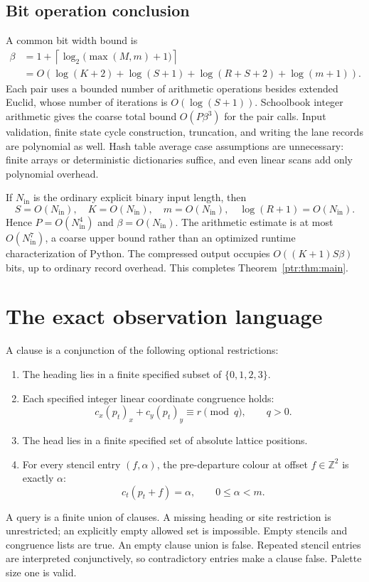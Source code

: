 \documentclass[11pt,letterpaper]{article}
\theoremstyle{definition}\newtheorem{definition}[theorem]{Definition}
\theoremstyle{remark}\newtheorem{remark}[theorem]{Remark}
\newcommand{\Z}{\mathbb Z}\newcommand{\N}{\mathbb N}\newcommand{\Zp}{\mathbb Z_{>0}}
\begin{document}
\subsection{Bit operation conclusion}
A common bit width bound is
\begin{align}\label{ptr:eq:beta}
 \beta&=1+\left\lceil\log_2\bigl(\max(M,m)+1\bigr)\right\rceil\nonumber\\
 &=O\!\left(\log(K+2)+\log(S+1)+\log(R+S+2)+\log(m+1)\right).
\end{align}
Each pair uses a bounded number of arithmetic operations besides extended Euclid, whose number of iterations is $O(\log(S+1))$. Schoolbook integer arithmetic gives the coarse total bound $O(P\beta^3)$ for the pair calls. Input validation, finite state cycle construction, truncation, and writing the lane records are polynomial as well. Hash table average case assumptions are unnecessary: finite arrays or deterministic dictionaries suffice, and even linear scans add only polynomial overhead.

If $N_{\mathrm{in}}$ is the ordinary explicit binary input length, then
\[
 S=O(N_{\mathrm{in}}),\quad K=O(N_{\mathrm{in}}),\quad m=O(N_{\mathrm{in}}),
 \quad\log(R+1)=O(N_{\mathrm{in}}).
\]
Hence $P=O(N_{\mathrm{in}}^4)$ and $\beta=O(N_{\mathrm{in}})$. The arithmetic estimate is at most $O(N_{\mathrm{in}}^7)$, a coarse upper bound rather than an optimized runtime characterization of Python. The compressed output occupies $O((K+1)S\beta)$ bits, up to ordinary record overhead. This completes Theorem~\ref{ptr:thm:main}.

\section{The exact observation language}\label{ptr:sec:observations}
A clause is a conjunction of the following optional restrictions:
\begin{enumerate}
\item The heading lies in a finite specified subset of $\{0,1,2,3\}$.
\item Each specified integer linear coordinate congruence holds:
\[
 c_x(p_t)_x+c_y(p_t)_y\equiv r\pmod q,\qquad q>0.
\]
\item The head lies in a finite specified set of absolute lattice positions.
\item For every stencil entry $(f,\alpha)$, the pre-departure colour at offset $f\in\Z^2$ is exactly $\alpha$:
\[
 c_t(p_t+f)=\alpha,\qquad0\le\alpha<m.
\]
\end{enumerate}
A query is a finite union of clauses. A missing heading or site restriction is unrestricted; an explicitly empty allowed set is impossible. Empty stencils and congruence lists are true. An empty clause union is false. Repeated stencil entries are interpreted conjunctively, so contradictory entries make a clause false. Palette size one is valid.
\end{document}
